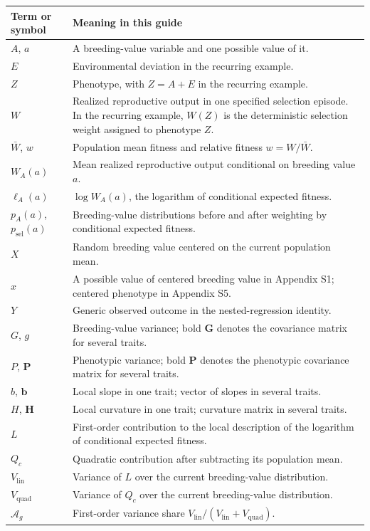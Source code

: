 \documentclass[11pt]{article}
\newcommand{\vect}[1]{\boldsymbol{#1}}
\newcommand{\mat}[1]{\mathbf{#1}}
\newcommand{\Ag}{\ensuremath{\mathcal A_g}}
\newcommand{\Vlin}{\ensuremath{V_{\mathrm{lin}}}}
\newcommand{\Vquad}{\ensuremath{V_{\mathrm{quad}}}}
\begin{document}
\begin{center}
\begin{tabularx}{\textwidth}{@{}p{}X@{}}
\toprule
Term or symbol & Meaning in this guide \\
\midrule
$A$, $a$ & A breeding-value variable and one possible value of it. \\
$E$ & Environmental deviation in the recurring example. \\
$Z$ & Phenotype, with $Z=A+E$ in the recurring example. \\
$W$ & Realized reproductive output in one specified selection episode.  In
the recurring example, $W(Z)$ is the deterministic selection weight assigned
to phenotype $Z$. \\
$\bar W$, $w$ & Population mean fitness and relative fitness
$w=W/\bar W$. \\
$W_A(a)$ & Mean realized reproductive output conditional on breeding value
$a$. \\
$\ell_A(a)$ & $\log W_A(a)$, the logarithm of conditional expected fitness. \\
$p_A(a)$, $p_{\mathrm{sel}}(a)$ & Breeding-value distributions before and
after weighting by conditional expected fitness. \\
$X$ & Random breeding value centered on the current population mean. \\
$x$ & A possible value of centered breeding value in Appendix S1; centered
phenotype in Appendix S5. \\
$Y$ & Generic observed outcome in the nested-regression identity. \\
$G$, $g$ & Breeding-value variance; bold $\mat G$ denotes the covariance
matrix for several traits. \\
$P$, $\mat P$ & Phenotypic variance; bold $\mat P$ denotes the phenotypic
covariance matrix for several traits. \\
$b$, $\vect b$ & Local slope in one trait; vector of slopes in several traits. \\
$H$, $\mat H$ & Local curvature in one trait; curvature matrix in several
traits. \\
$L$ & First-order contribution to the local description of the logarithm of
conditional expected fitness. \\
$Q_c$ & Quadratic contribution after subtracting its population mean. \\
$\Vlin$ & Variance of $L$ over the current breeding-value distribution. \\
$\Vquad$ & Variance of $Q_c$ over the current breeding-value distribution. \\
$\Ag$ & First-order variance share $\Vlin/(\Vlin+\Vquad)$. \\
\bottomrule
\end{tabularx}
\end{center}
\end{document}
